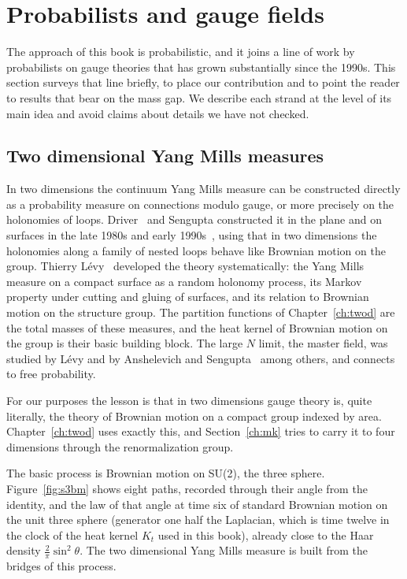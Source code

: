\section{Probabilists and gauge fields}\label{ch:probabilists}

The approach of this book is probabilistic, and it joins a line of work by probabilists on gauge theories that has grown substantially since the 1990s. This section surveys that line briefly, to place our contribution and to point the reader to results that bear on the mass gap. We describe each strand at the level of its main idea and avoid claims about details we have not checked.

\subsection{Two dimensional Yang Mills measures}

In two dimensions the continuum Yang Mills measure can be constructed directly as a probability measure on connections modulo gauge, or more precisely on the holonomies of loops. Driver~\cite{Dr89} and Sengupta constructed it in the plane and on surfaces in the late 1980s and early 1990s~\cite{Se97}, using that in two dimensions the holonomies along a family of nested loops behave like Brownian motion on the group. Thierry L\'evy~\cite{Le03} developed the theory systematically: the Yang Mills measure on a compact surface as a random holonomy process, its Markov property under cutting and gluing of surfaces, and its relation to Brownian motion on the structure group. The partition functions of Chapter~\ref{ch:twod} are the total masses of these measures, and the heat kernel of Brownian motion on the group is their basic building block. The large $N$ limit, the master field, was studied by L\'evy and by Anshelevich and Sengupta~\cite{AS12} among others, and connects to free probability.

For our purposes the lesson is that in two dimensions gauge theory is, quite literally, the theory of Brownian motion on a compact group indexed by area. Chapter~\ref{ch:twod} uses exactly this, and Section~\ref{ch:mk} tries to carry it to four dimensions through the renormalization group.

The basic process is Brownian motion on SU(2), the three sphere. Figure~\ref{fig:s3bm} shows eight paths, recorded through their angle from the identity, and the law of that angle at time six of standard Brownian motion on the unit three sphere (generator one half the Laplacian, which is time twelve in the clock of the heat kernel $K_t$ used in this book), already close to the Haar density $\frac2\pi\sin^2\theta$. The two dimensional Yang Mills measure is built from the bridges of this process.

